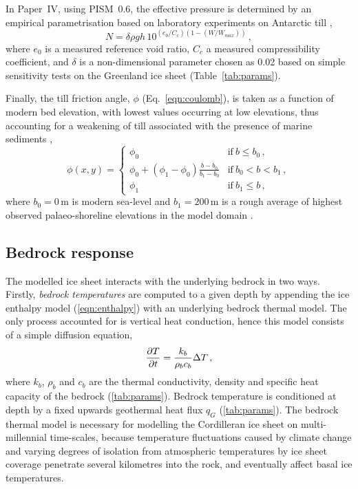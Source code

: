 \documentclass[a4paper]{kappa}
\newcommand{\CCYC}[0]{Paper~IV}     %
\begin{document}
In {\CCYC}, using PISM~0.6, the effective pressure is determined by an
empirical parametrisation based on laboratory experiments on Antarctic till
\citep{Tulaczyk.etal.2000, Bueler.Pelt.2014},
\begin{equation}
    N = \delta \rho gh \, 10^{(e_0/C_c) (1 - (W/W_{max}))} \,,
\end{equation}
where $e_0$ is a measured reference void ratio, $C_c$ a measured
compressibility coefficient, and $\delta$ is a non-dimensional parameter
chosen as 0.02 based on simple sensitivity tests on the Greenland ice sheet
(Table~\ref{tab:params}).

Finally, the till friction angle, $\phi$ (Eq.~\ref{eqn:coulomb}), is taken as a
function of modern bed
elevation, with lowest values occurring at low elevations, thus accounting for
a weakening of till associated with the presence of marine sediments
\citep[cf.][Eq.~10]{Martin.etal.2011},
\begin{equation}
    \phi(x,y) =
    \begin{cases}
        \phi_0 & \text{if}\ b \le b_0 \,, \\
        \phi_0 + (\phi_1-\phi_0) \frac{b - b_0}{b_1-b_0}
                & \text{if}\ b_0 < b < b_1 \,, \\
        \phi_1 & \text{if}\ b_1 \le b \,,
    \end{cases}
\end{equation}
where $b_0=0$\,m is modern sea-level and $b_1=200$\,m is a rough average of
highest observed palaeo-shoreline elevations in the model domain
\citep[\cref{tab:params};][]{Clague.James.2002}.


\subsection{Bedrock response}

The modelled ice sheet interacts with the underlying bedrock in two ways.
Firstly, \emph{bedrock temperatures} are computed to a given depth by
appending the
ice enthalpy model (\ref{eqn:enthalpy}) with an underlying bedrock thermal
model. The only process accounted for is vertical heat conduction, hence this model
consists of a simple diffusion equation,
\begin{equation}
    \pdv{T}{t} = \frac{k_b}{\rho_b c_b} \Delta T \,,
\end{equation}
where $k_b$, $\rho_b$ and $c_b$ are the thermal conductivity, density and
specific heat capacity of the bedrock (\cref{tab:params}).
Bedrock temperature is conditioned at depth by a fixed upwards geothermal heat
flux $q_G$  (\cref{tab:params}). The bedrock thermal model
is necessary for modelling the Cordilleran ice sheet on multi-millennial
time-scales, because temperature fluctuations caused by climate change and
varying degrees of isolation from atmospheric temperatures by ice sheet
coverage penetrate several kilometres
into the rock, and eventually affect basal ice temperatures.
\end{document}
